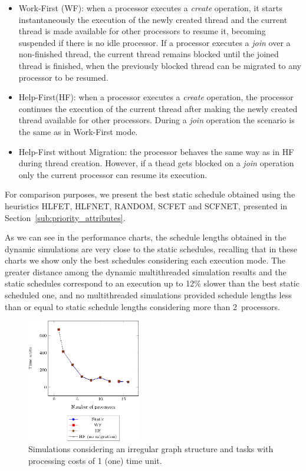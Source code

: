 \documentclass[twocolumn]{svjour3}
\begin{document}
\begin{itemize}
\item Work-First (WF): when a processor executes a \emph{create} operation, it starts instantaneously the execution of the newly created thread and the current thread is made available for other processors to resume it, becoming suspended if there is no idle processor. If a processor executes a \emph{join} over a non-finished thread, the current thread remains blocked until the joined thread is finished, when the previously blocked thread can be migrated to any processor to be resumed.
\item Help-First(HF): when a processor executes a \emph{create} operation, the processor continues the execution of the current thread after making the newly created thread available for other processors. During a \emph{join} operation the scenario is the same as in Work-First mode.
\item Help-First without Migration: the processor behaves the same way as in HF during thread creation. However, if a thead gets blocked on a \emph{join} operation only the current processor can resume its execution.
\end{itemize}

For comparison purposes, we present the best static schedule obtained using the heuristics HLFET, HLFNET, RANDOM, SCFET and SCFNET, presented in Section~\ref{sub:priority_attributes}.

As we can see in the performance charts, the schedule lengths obtained in the dynamic simulations are very close to the static schedules, recalling that in these charts we show only the best schedules considering each execution mode. The greater distance among the dynamic multithreaded simulation results and the static schedules correspond to an execution up to 12\% slower than the best static scheduled one, and no multithreaded simulations provided schedule lengths less than or equal to static schedule lengths considering more than 2~processors.

\begin{figure}[]
	\centering	
	\includegraphics[width=0.44\textwidth,angle=0]{figs/simulation_same_costs.eps}
	\caption{Simulations considering an irregular graph structure and tasks with processing costs of 1 (one) time unit.}
	\label{fig:simulation_same_costs}
\end{figure}
\end{document}
